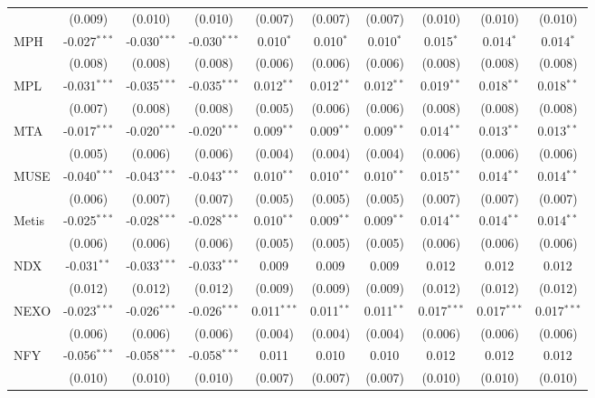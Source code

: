 \begin{table}[!htbp]
\begin{tabular}{@{\extracolsep{5pt}}lccccccccc}
  & (0.009) & (0.010) & (0.010) & (0.007) & (0.007) & (0.007) & (0.010) & (0.010) & (0.010) \\
 MPH & -0.027$^{***}$ & -0.030$^{***}$ & -0.030$^{***}$ & 0.010$^{*}$ & 0.010$^{*}$ & 0.010$^{*}$ & 0.015$^{*}$ & 0.014$^{*}$ & 0.014$^{*}$ \\
  & (0.008) & (0.008) & (0.008) & (0.006) & (0.006) & (0.006) & (0.008) & (0.008) & (0.008) \\
 MPL & -0.031$^{***}$ & -0.035$^{***}$ & -0.035$^{***}$ & 0.012$^{**}$ & 0.012$^{**}$ & 0.012$^{**}$ & 0.019$^{**}$ & 0.018$^{**}$ & 0.018$^{**}$ \\
  & (0.007) & (0.008) & (0.008) & (0.005) & (0.006) & (0.006) & (0.008) & (0.008) & (0.008) \\
 MTA & -0.017$^{***}$ & -0.020$^{***}$ & -0.020$^{***}$ & 0.009$^{**}$ & 0.009$^{**}$ & 0.009$^{**}$ & 0.014$^{**}$ & 0.013$^{**}$ & 0.013$^{**}$ \\
  & (0.005) & (0.006) & (0.006) & (0.004) & (0.004) & (0.004) & (0.006) & (0.006) & (0.006) \\
 MUSE & -0.040$^{***}$ & -0.043$^{***}$ & -0.043$^{***}$ & 0.010$^{**}$ & 0.010$^{**}$ & 0.010$^{**}$ & 0.015$^{**}$ & 0.014$^{**}$ & 0.014$^{**}$ \\
  & (0.006) & (0.007) & (0.007) & (0.005) & (0.005) & (0.005) & (0.007) & (0.007) & (0.007) \\
 Metis & -0.025$^{***}$ & -0.028$^{***}$ & -0.028$^{***}$ & 0.010$^{**}$ & 0.009$^{**}$ & 0.009$^{**}$ & 0.014$^{**}$ & 0.014$^{**}$ & 0.014$^{**}$ \\
  & (0.006) & (0.006) & (0.006) & (0.005) & (0.005) & (0.005) & (0.006) & (0.006) & (0.006) \\
 NDX & -0.031$^{**}$ & -0.033$^{***}$ & -0.033$^{***}$ & 0.009$^{}$ & 0.009$^{}$ & 0.009$^{}$ & 0.012$^{}$ & 0.012$^{}$ & 0.012$^{}$ \\
  & (0.012) & (0.012) & (0.012) & (0.009) & (0.009) & (0.009) & (0.012) & (0.012) & (0.012) \\
 NEXO & -0.023$^{***}$ & -0.026$^{***}$ & -0.026$^{***}$ & 0.011$^{***}$ & 0.011$^{**}$ & 0.011$^{**}$ & 0.017$^{***}$ & 0.017$^{***}$ & 0.017$^{***}$ \\
  & (0.006) & (0.006) & (0.006) & (0.004) & (0.004) & (0.004) & (0.006) & (0.006) & (0.006) \\
 NFY & -0.056$^{***}$ & -0.058$^{***}$ & -0.058$^{***}$ & 0.011$^{}$ & 0.010$^{}$ & 0.010$^{}$ & 0.012$^{}$ & 0.012$^{}$ & 0.012$^{}$ \\
  & (0.010) & (0.010) & (0.010) & (0.007) & (0.007) & (0.007) & (0.010) & (0.010) & (0.010) \\

\end{tabular}
\end{table}
